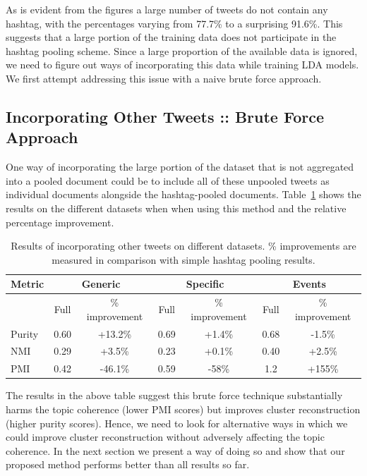 \documentclass[10pt,a5paper,twoside]{article}
\begin{document}
As is evident from the figures a large number of tweets do not contain
any hashtag, with the percentages varying from 77.7\% to a surprising
91.6\%. This suggests that a large portion of the training data does
not participate in the hashtag pooling scheme. Since a large proportion
of the available data is ignored, we need to figure out ways of
incorporating this data while training LDA models.  We first attempt addressing
this issue with a naive brute force approach.

\subsection{Incorporating Other Tweets :: Brute Force Approach}

One way of incorporating the large portion of the dataset that is not
aggregated into a pooled document could be to include all of these
unpooled tweets as individual documents alongside the hashtag-pooled
documents.  Table~\ref{tbl-8} shows the results on the different datasets when
when using this method and the relative percentage improvement.

\begin{table}[!h]
\centering
{
	\begin{tabular}{|l|cc|cc|cc|}
	\hline
	Metric  & \multicolumn {2}{c|}{Generic} & \multicolumn {2}{c|}{Specific} & \multicolumn {2}{c|}{Events}\\
	\hline
	 & Full & \% improvement & Full & \% improvement & Full & \% improvement\\
	\hline
	Purity & 0.60 & +13.2\% & 0.69 & +1.4\% & 0.68 & -1.5\% \\
	\hline
	NMI & 0.29 & +3.5\% & 0.23 & +0.1\% & 0.40 & +2.5\% \\
	\hline
	PMI & 0.42 & -46.1\% & 0.59 & -58\% & 1.2 & +155\% \\
	\hline
	\end{tabular}
}
\caption{Results of incorporating other tweets on different datasets. \% improvements are measured in comparison with simple hashtag pooling results.}\label{tbl-8}
\end{table}

The results in the above table suggest this brute force technique
substantially harms the topic coherence (lower PMI scores) but
improves cluster reconstruction (higher purity scores).  Hence, we
need to look for alternative ways in which we could improve cluster
reconstruction without adversely affecting the topic coherence. In the
next section we present a way of doing so and show that our proposed
method performs better than all results so far.
\end{document}
